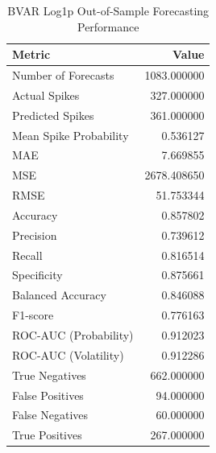 \begin{table}
\caption{BVAR Log1p Out-of-Sample Forecasting Performance}
\label{tab:4.10}
\begin{tabular}{lr}
\toprule
Metric & Value \\
\midrule
Number of Forecasts & 1083.000000 \\
Actual Spikes & 327.000000 \\
Predicted Spikes & 361.000000 \\
Mean Spike Probability & 0.536127 \\
MAE & 7.669855 \\
MSE & 2678.408650 \\
RMSE & 51.753344 \\
Accuracy & 0.857802 \\
Precision & 0.739612 \\
Recall & 0.816514 \\
Specificity & 0.875661 \\
Balanced Accuracy & 0.846088 \\
F1-score & 0.776163 \\
ROC-AUC (Probability) & 0.912023 \\
ROC-AUC (Volatility) & 0.912286 \\
True Negatives & 662.000000 \\
False Positives & 94.000000 \\
False Negatives & 60.000000 \\
True Positives & 267.000000 \\
\bottomrule
\end{tabular}
\end{table}
